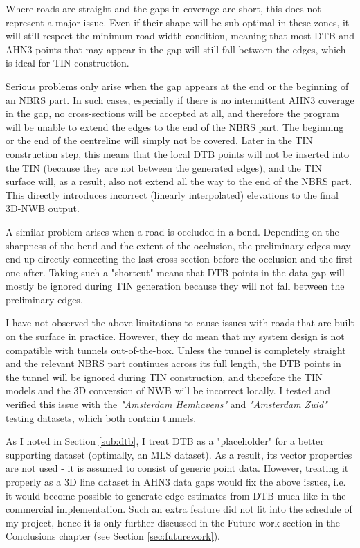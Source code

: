 Where roads are straight and the gaps in coverage are short, this does not represent a major issue. Even if their shape will be sub-optimal in these zones, it will still respect the minimum road width condition, meaning that most DTB and AHN3 points that may appear in the gap will still fall between the edges, which is ideal for TIN construction.

Serious problems only arise when the gap appears at the end or the beginning of an NBRS part. In such cases, especially if there is no intermittent AHN3 coverage in the gap, no cross-sections will be accepted at all, and therefore the program will be unable to extend the edges to the end of the NBRS part. The beginning or the end of the centreline will simply not be covered. Later in the TIN construction step, this means that the local DTB points will not be inserted into the TIN (because they are not between the generated edges), and the TIN surface will, as a result, also not extend all the way to the end of the NBRS part. This directly introduces incorrect (linearly interpolated) elevations to the final 3D-NWB output.

A similar problem arises when a road is occluded in a bend. Depending on the sharpness of the bend and the extent of the occlusion, the preliminary edges may end up directly connecting the last cross-section before the occlusion and the first one after. Taking such a "shortcut" means that DTB points in the data gap will mostly be ignored during TIN generation because they will not fall between the preliminary edges.

I have not observed the above limitations to cause issues with roads that are built on the surface in practice. However, they do mean that my system design is not compatible with tunnels out-of-the-box. Unless the tunnel is completely straight and the relevant NBRS part continues across its full length, the DTB points in the tunnel will be ignored during TIN construction, and therefore the TIN models and the 3D conversion of NWB will be incorrect locally. I tested and verified this issue with the \textit{"Amsterdam Hemhavens"} and \textit{"Amsterdam Zuid"} testing datasets, which both contain tunnels.

As I noted in Section \ref{sub:dtb}, I treat DTB as a "placeholder" for a better supporting dataset (optimally, an MLS dataset). As a result, its vector properties are not used - it is assumed to consist of generic point data. However, treating it properly as a 3D line dataset in AHN3 data gaps would fix the above issues, i.e. it would become possible to generate edge estimates from DTB much like in the commercial implementation. Such an extra feature did not fit into the schedule of my project, hence it is only further discussed in the Future work section in the Conclusions chapter (see Section \ref{sec:futurework}).

